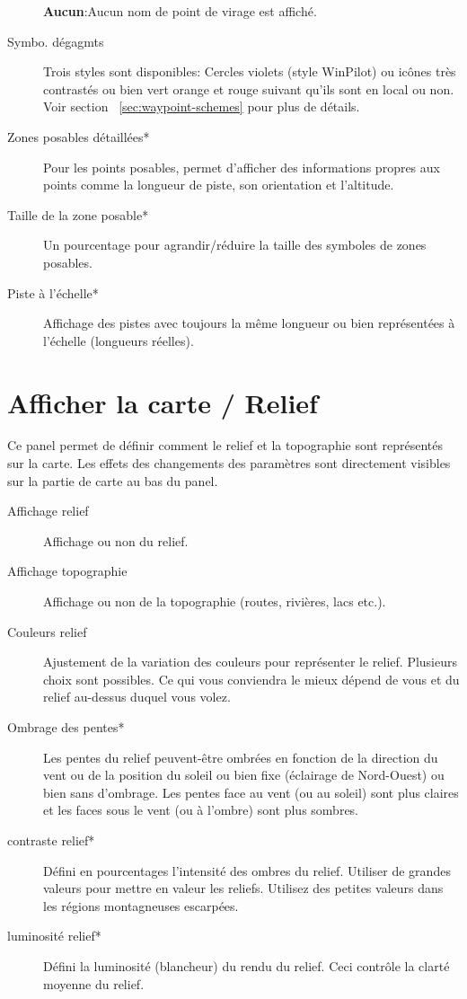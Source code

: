 \begin{description}
  {\bf Aucun}:Aucun nom de point de virage est affiché.
\item[Symbo. dégagmts]  \label{conf:waypointicons} Trois styles sont disponibles:
  Cercles violets (style WinPilot) ou icônes très contrastés ou bien vert orange et rouge suivant qu'ils sont en local ou non. Voir section ~\ref{sec:waypoint-schemes} pour plus de détails.
\item[Zones posables détaillées*]   Pour les points posables, permet d'afficher des informations propres aux points comme la longueur de piste, son orientation et l'altitude.
\item[Taille de la zone posable*]  Un pourcentage  pour agrandir/réduire la taille des symboles de zones posables.
\item[Piste à l'échelle*]  Affichage des pistes avec toujours la même longueur ou bien représentées à l'échelle (longueurs réelles).
\end{description}


\section{Afficher la carte / Relief}\label{sec:terrain-display}

Ce panel permet de définir comment le relief et la topographie sont représentés sur la carte. Les effets  des changements des paramètres sont directement visibles sur la partie de carte au bas du panel.

\begin{description}
\item[Affichage relief]  Affichage ou non du relief.
\item[Affichage topographie]  Affichage ou non de la topographie (routes, rivières, lacs etc.).
\item[Couleurs relief]  Ajustement de la variation des couleurs pour représenter le relief. Plusieurs choix sont possibles. Ce qui vous conviendra le mieux dépend de vous et du relief au-dessus duquel vous volez.
\item[Ombrage des pentes*]  \label{conf:shading} Les pentes du relief peuvent-être ombrées en fonction de la direction du vent ou de la position du soleil ou bien fixe (éclairage de Nord-Ouest) ou bien sans d'ombrage. Les pentes face au vent (ou au soleil) sont plus claires et les faces sous le vent (ou à l'ombre) sont plus sombres. 
\item[contraste relief*]  Défini en pourcentages l'intensité des ombres du relief. Utiliser de grandes valeurs pour mettre en valeur les reliefs. Utilisez des petites valeurs dans les régions montagneuses escarpées.
\item[luminosité relief*]  Défini la luminosité (blancheur) du rendu du relief. Ceci contrôle la clarté moyenne du relief.
\end{description}


